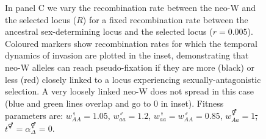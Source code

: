 \documentclass[10pt,letterpaper]{article}
\providecommand{\DIFaddtex}[1]{{\protect\color{blue}\uwave{#1}}} %
\providecommand{\DIFdeltex}[1]{{\protect\color{red}\sout{#1}}}                      %
\providecommand{\DIFaddFL}[1]{\DIFadd{#1}} %
\providecommand{\DIFdelFL}[1]{\DIFdel{#1}} %
\providecommand{\DIFaddbeginFL}{} %
\providecommand{\DIFaddendFL}{} %
\providecommand{\DIFdelbeginFL}{} %
\providecommand{\DIFdelendFL}{} %
\providecommand{\DIFadd}[1]{\texorpdfstring{\DIFaddtex{#1}}{#1}} %
\providecommand{\DIFdel}[1]{\texorpdfstring{\DIFdeltex{#1}}{}} %
\newcommand{\DIFscaledelfig}{0.5}
\newlength{\DIFdelgraphicswidth} %
\newlength{\DIFdelgraphicsheight} %
\newcommand{\DIFaddincludegraphics}[2][]{{\color{blue}\fbox{\DIFOincludegraphics[#1]{#2}}}} %
\newcommand{\DIFdelincludegraphics}[2][]{%
\sbox{\DIFdelgraphicsbox}{\DIFOincludegraphics[#1]{#2}}%
\settoboxwidth{\DIFdelgraphicswidth}{\DIFdelgraphicsbox} %
\settoboxtotalheight{\DIFdelgraphicsheight}{\DIFdelgraphicsbox} %
\scalebox{\DIFscaledelfig}{%
\parbox[b]{\DIFdelgraphicswidth}{\usebox{\DIFdelgraphicsbox}\\[-\baselineskip] \rule{\DIFdelgraphicswidth}{0em}}\llap{\resizebox{\DIFdelgraphicswidth}{\DIFdelgraphicsheight}{%
\setlength{\unitlength}{\DIFdelgraphicswidth}%
\begin{picture}(1,1)%
\thicklines\linethickness{2pt} %
{\color[rgb]{1,0,0}\put(0,0){\framebox(1,1){}}}%
{\color[rgb]{1,0,0}\put(0,0){\line( 1,1){1}}}%
{\color[rgb]{1,0,0}\put(0,1){\line(1,-1){1}}}%
\end{picture}%
}\hspace*{3pt}}} %
} %
\DeclareRobustCommand{\DIFaddbeginFL}{\DIFOaddbeginFL \let\includegraphics\DIFaddincludegraphics} %
\DeclareRobustCommand{\DIFaddendFL}{\DIFOaddendFL \let\includegraphics\DIFOincludegraphics} %
\DeclareRobustCommand{\DIFdelbeginFL}{\DIFOdelbeginFL \let\includegraphics\DIFdelincludegraphics} %
\DeclareRobustCommand{\DIFdelendFL}{\DIFOaddendFL \let\includegraphics\DIFOincludegraphics} %
\begin{document}
\begin{figure}[!h]
{In panel C we vary the recombination rate between the neo-W and the selected locus ($R$) for a fixed recombination rate between the ancestral sex-determining locus and the selected locus ($r=0.005$). 
Coloured markers show recombination rates for which the temporal dynamics of invasion are plotted in the inset, demonstrating that neo-W alleles can reach pseudo-fixation if they are more (black) or less (red) closely linked to a locus experiencing sexually-antagonistic selection. 
A very loosely linked neo-W does not spread in this case (blue and green lines overlap and go to 0 in inset). 
Fitness parameters are: $w_{AA}^\female = 1.05$, $w_{aa}^\male = 1.2$, $w_{aa}^\female = w_{AA}^\male = 0.85$, \DIFdelbeginFL \DIFdelFL{$w_{Aa}^\Hermaphrodite = 1$,  $t^\Hermaphrodite = \alpha^\Hermaphrodite_\Delta = 0$}\DIFdelendFL \DIFaddbeginFL \DIFaddFL{$w_{Aa}^\circ = 1$}\DIFaddendFL .%
}
\label{fig:SexAntagTighter}
\end{figure}
\end{document}
